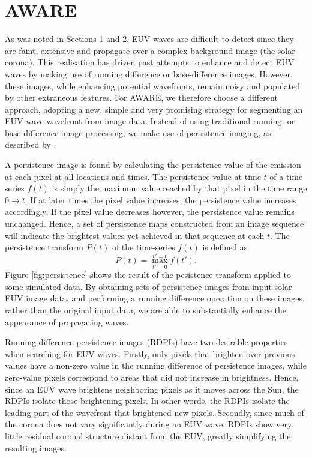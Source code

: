 \section{AWARE}\label{sec:aware}

As was noted in Sections 1 and 2, EUV waves are difficult to detect
since they are faint, extensive and propagate over a complex
background image (the solar corona). This realisation has driven past
attempts to enhance and detect EUV waves by making use of running
difference or base-difference images. However, these images, while
enhancing potential wavefronts, remain noisy and populated by other
extraneous features. For AWARE, we therefore choose a different
approach, adopting a new, simple and very promising strategy for
segmenting an EUV wave wavefront from image data. Instead of using
traditional running- or base-difference image processing, we make use
of persistence imaging, as described by \citet{2014AAS...22421838T}.

A persistence image is found by calculating the persistence value of
the emission at each pixel at all locations and times.  The
persistence value at time $t$ of a time series $f(t)$ is simply the
maximum value reached by that pixel in the time range $0\rightarrow
t$.  If at later times the pixel value increases, the persistence
value increases accordingly. If the pixel value decreases however, the
persistence value remains unchanged. Hence, a set of persistence maps
constructed from an image sequence will indicate the brightest values
yet achieved in that sequence at each $t$.  The persistence transform
$P(t)$ of the time-series $f(t)$ is defined as
\begin{equation}
\label{eqn:persisttransform}
P(t) = \max_{t'=0}^{t'=t}f(t').
\end{equation}
Figure \ref{fig:persistence} shows the result of the pesistence
transform applied to some simulated data.  By obtaining sets of
persistence images from input solar EUV image data, and performing a
running difference operation on these images, rather than the original
input data, we are able to substantially enhance the appearance of
propagating waves.

Running difference persistence images (RDPIs) have two desirable
properties when searching for EUV waves.  Firstly, only pixels that
brighten over previous values have a non-zero value in the running
difference of persistence images, while zero-value pixels correspond
to areas that did not increase in brightness. Hence, since an EUV wave
brightens neighboring pixels as it moves across the Sun, the RDPIs
isolate those brightening pixels.  In other words, the RDPIs isolate
the leading part of the wavefront that brightened new pixels.
Secondly, since much of the corona does not vary significantly during
an EUV wave, RDPIs show very little residual coronal structure distant
from the EUV, greatly simplifying the resulting images.

